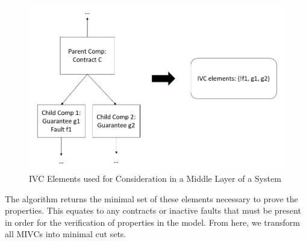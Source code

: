 \begin{figure}[h!]
	\hspace*{-2cm}
	\vspace{-0.1in} 
	\begin{center}
		\includegraphics[scale=0.5]{images/ivcElements2.png}
	\caption{IVC Elements used for Consideration in a Middle Layer of a System}
		\label{fig:ivcElements2}
	\end{center}
\end{figure}

The \aivcalg algorithm returns the minimal set of these elements necessary to prove the properties. This equates to any contracts or inactive faults that must be present in order for the verification of properties in the model. From here, we transform all MIVCs into minimal cut sets.






